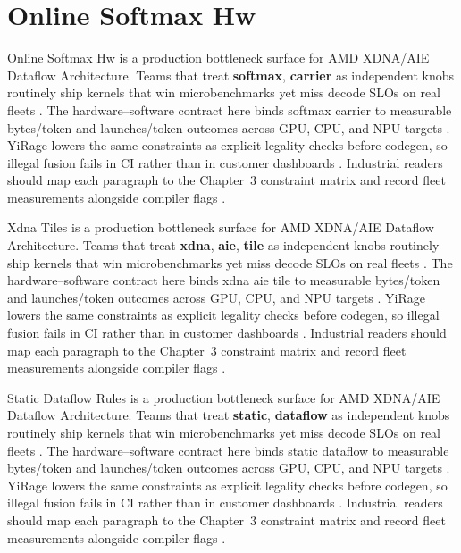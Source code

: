 \section{Online Softmax Hw}
\label{sec:online_softmax_hw}

Online Softmax Hw is a production bottleneck surface for AMD XDNA/AIE Dataflow Architecture. Teams that treat \textbf{softmax}, \textbf{carrier} as independent knobs routinely ship kernels that win microbenchmarks yet miss decode SLOs on real fleets \citep{nvidia2022hopper,amd2024aie}. The hardware--software contract here binds softmax carrier to measurable bytes/token and launches/token outcomes across GPU, CPU, and NPU targets \citep{semianalysis2024tma,dlbook}. YiRage lowers the same constraints as explicit legality checks before codegen, so illegal fusion fails in CI rather than in customer dashboards \citep{amd2024xdna,dao2022flashattention}. Industrial readers should map each paragraph to the Chapter~3 constraint matrix and record fleet measurements alongside compiler flags \citep{amd2024aie,kwon2023vllm}.

Xdna Tiles is a production bottleneck surface for AMD XDNA/AIE Dataflow Architecture. Teams that treat \textbf{xdna}, \textbf{aie}, \textbf{tile} as independent knobs routinely ship kernels that win microbenchmarks yet miss decode SLOs on real fleets \citep{taxbreak2026,semianalysis2024tma}. The hardware--software contract here binds xdna aie tile to measurable bytes/token and launches/token outcomes across GPU, CPU, and NPU targets \citep{memoryfloor2026,amd2024xdna}. YiRage lowers the same constraints as explicit legality checks before codegen, so illegal fusion fails in CI rather than in customer dashboards \citep{nvidia2022hopper,amd2024aie}. Industrial readers should map each paragraph to the Chapter~3 constraint matrix and record fleet measurements alongside compiler flags \citep{semianalysis2024tma,dlbook}.

Static Dataflow Rules is a production bottleneck surface for AMD XDNA/AIE Dataflow Architecture. Teams that treat \textbf{static}, \textbf{dataflow} as independent knobs routinely ship kernels that win microbenchmarks yet miss decode SLOs on real fleets \citep{memoryfloor2026,amd2024xdna}. The hardware--software contract here binds static dataflow to measurable bytes/token and launches/token outcomes across GPU, CPU, and NPU targets \citep{nvidia2022hopper,amd2024aie}. YiRage lowers the same constraints as explicit legality checks before codegen, so illegal fusion fails in CI rather than in customer dashboards \citep{semianalysis2024tma,dlbook}. Industrial readers should map each paragraph to the Chapter~3 constraint matrix and record fleet measurements alongside compiler flags \citep{amd2024xdna,dao2022flashattention}.

